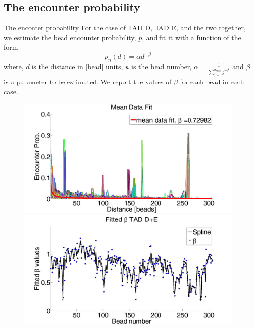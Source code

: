 \documentclass[8pt]{beamer}
\begin{document}
\subsection{The encounter probability}\label{subsection_theEncounterProbability}
\begin{frame}{The enconter probability}
For the case of TAD D, TAD E, and the two together, we estimate the bead encounter probability, $p$, and fit it with a function of the form 
\begin{equation*}
p_n(d)=\alpha d^{-\beta}
\end{equation*}
where, $d$ is the distance in [bead] units, $n$ is the bead number, $\alpha=\frac{1}{\sum_{j=1}^{d_{max}}j^{-\beta}}$ and $\beta$ is a parameter to be estimated.
We report the values of $\beta$ for each bead in each case.
\begin{figure}[H]
\includegraphics[scale=0.1]{meanDataFitTADDAndE}
\includegraphics[scale=0.1]{fittedExpValuesWithSplineAverageTADDAndE}
\end{figure}
\end{frame}
\end{document}
